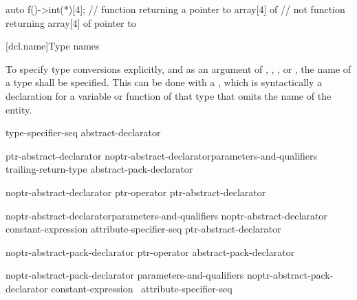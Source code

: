 \begin{codeblock}
auto f()->int(*)[4];  // function returning a pointer to array[4] of 
                      // not function returning array[4] of pointer to 
\end{codeblock}
\exitexample \exitnote

[dcl.name]{Type names}

\pnum
{}%
To specify type conversions explicitly,
%
and as an argument of
,
,
,
or
,
the name of a type shall be specified.
This can be done with a
,
which is syntactically a declaration for a variable or function
of that type that omits the name of the entity.

\begin{bnf}
\br
    type-specifier-seq abstract-declarator\opt
\end{bnf}

\begin{bnf}
\br
    ptr-abstract-declarator\br
    noptr-abstract-declarator\opt parameters-and-qualifiers trailing-return-type\br
    abstract-pack-declarator
\end{bnf}

\begin{bnf}
\br
    noptr-abstract-declarator\br
    ptr-operator ptr-abstract-declarator\opt
\end{bnf}

\begin{bnf}
\br
    noptr-abstract-declarator\opt parameters-and-qualifiers\br
    noptr-abstract-declarator\opt \terminal{[} constant-expression\opt{} \terminal{]} attribute-specifier-seq\opt\br
    \terminal{(} ptr-abstract-declarator \terminal{)}
\end{bnf}

\begin{bnf}
\br
    noptr-abstract-pack-declarator\br
    ptr-operator abstract-pack-declarator
\end{bnf}

\begin{bnf}
\br
    noptr-abstract-pack-declarator parameters-and-qualifiers\br
    noptr-abstract-pack-declarator \terminal{[} constant-expression\opt\ \terminal{]} attribute-specifier-seq\opt\br
\end{bnf}

